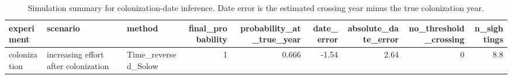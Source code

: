\begin{table}

\caption{Simulation summary for colonization-date inference. Date error is the estimated crossing year minus the true colonization year.}
\centering
\begin{tabular}[t]{lllrrrrrr}
\toprule
experiment & scenario & method & final\_probability & probability\_at\_true\_year & date\_error & absolute\_date\_error & no\_threshold\_crossing & n\_sightings\\
\midrule
colonization & increasing effort after colonization & Time\_reversed\_Solow & 1 & 0.666 & -1.54 & 2.64 & 0 & 8.8\\
\bottomrule
\end{tabular}
\end{table}
